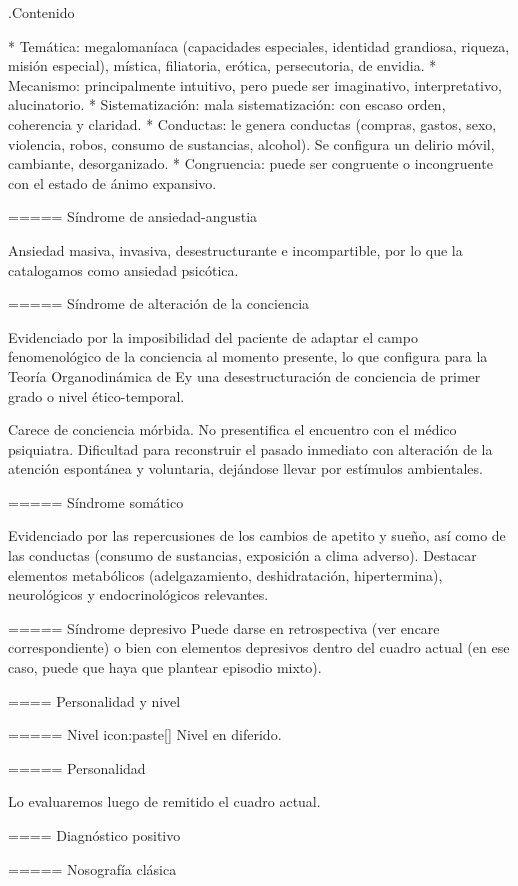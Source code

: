 \documentclass[encares.tex]{subfiles}
\begin{document}
.Contenido

* Temática: megalomaníaca (capacidades especiales, identidad grandiosa, riqueza, misión especial), mística, filiatoria, erótica, persecutoria, de envidia.
* Mecanismo: principalmente intuitivo, pero puede ser imaginativo, interpretativo, alucinatorio.
* Sistematización: mala sistematización: con escaso orden, coherencia y claridad.
* Conductas: le genera conductas (compras, gastos, sexo, violencia, robos, consumo de sustancias, alcohol). Se configura un delirio móvil, cambiante, desorganizado.
* Congruencia: puede ser congruente o incongruente con el estado de ánimo expansivo.

===== Síndrome de ansiedad-angustia

Ansiedad masiva, invasiva, desestructurante e incompartible, por lo que la catalogamos como ansiedad psicótica.

===== Síndrome de alteración de la conciencia

Evidenciado por la imposibilidad del paciente de adaptar el campo fenomenológico de la conciencia al momento presente, lo que configura para la Teoría Organodinámica de Ey una desestructuración de conciencia de primer grado o nivel ético-temporal.

Carece de conciencia mórbida. No presentifica el encuentro con el médico psiquiatra. Dificultad para reconstruir el pasado inmediato con alteración de la atención espontánea y voluntaria, dejándose llevar por estímulos ambientales.

===== Síndrome somático

Evidenciado por las repercusiones de los cambios de apetito y sueño, así como de las conductas (consumo de sustancias, exposición a clima adverso). Destacar elementos metabólicos (adelgazamiento, deshidratación, hipertermina), neurológicos y endocrinológicos relevantes.

===== Síndrome depresivo
Puede darse en retrospectiva (ver encare correspondiente) o bien con elementos depresivos dentro del cuadro actual (en ese caso, puede que haya que plantear episodio mixto).

==== Personalidad y nivel

===== Nivel
icon:paste[] Nivel en diferido.

===== Personalidad

Lo evaluaremos luego de remitido el cuadro actual.

==== Diagnóstico positivo

===== Nosografía clásica
\end{document}
